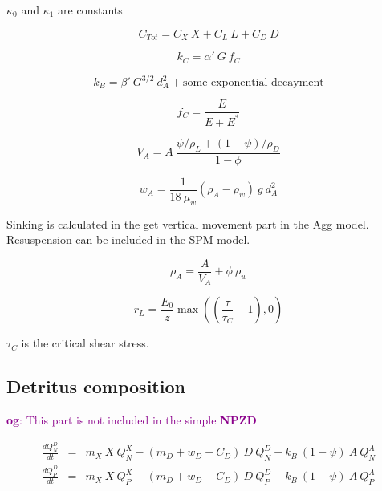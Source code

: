 \documentclass[fleqn]{article}                     %
\newcommand{\comment}[3][darkmagenta]{\textcolor{#1}{\textbf{#2}: #3}}
\begin{document}
$\kappa_0$ and $\kappa_1$ are constants

\begin{equation}
  C_{Tot} = C_X\ X + C_L\ L + C_D\ D
\end{equation}

\begin{equation}
  k_C = \alpha'\ G \ f_C
\end{equation}

\begin{equation}
  k_B = \beta'\ G^{3/2}\ d_A^2 + \textrm{some exponential decayment}
\end{equation}

\begin{equation}
  f_C = \frac{E}{E+E^*}
\end{equation}

\begin{equation}
  V_A = A\  \frac{\psi/ \rho_L + (1-\psi)/ \rho_D}{1-\phi}
\end{equation}

\begin{equation}
  w_A = \frac{1}{18\ \mu_w} (\rho_A-\rho_w)\ g\ d_A^2
\end{equation}

Sinking is calculated in the  get vertical movement part in the Agg model.
Resuspension can be included in the SPM model.

\begin{equation}
  \rho_A = \frac{A}{V_A}+\phi\ \rho_w
\end{equation}

\begin{equation}
r_L = \frac{E_0}{z}\max \left( (\frac{\tau}{\tau_C}-1) ,0 \right)
\end{equation}

$\tau_C$ is the critical shear stress.

\subsection{Detritus composition}
\comment{og}{This part is not included in the simple \textbf{NPZD}}

\begin{eqnarray}
  \frac{dQ^D_N}{dt} &=&  m_X\ X\ Q^X_N - (m_D + w_D + C_D)\ D\ Q^D_N + k_B\ (1-\psi)\ A\ Q^A_N \\
  \frac{dQ^D_P}{dt} &=& m_X\ X\ Q^X_P - (m_D + w_D + C_D)\ D\ Q^D_P + k_B\ (1-\psi)\ A\ Q^A_P
\end{eqnarray}
\end{document}
